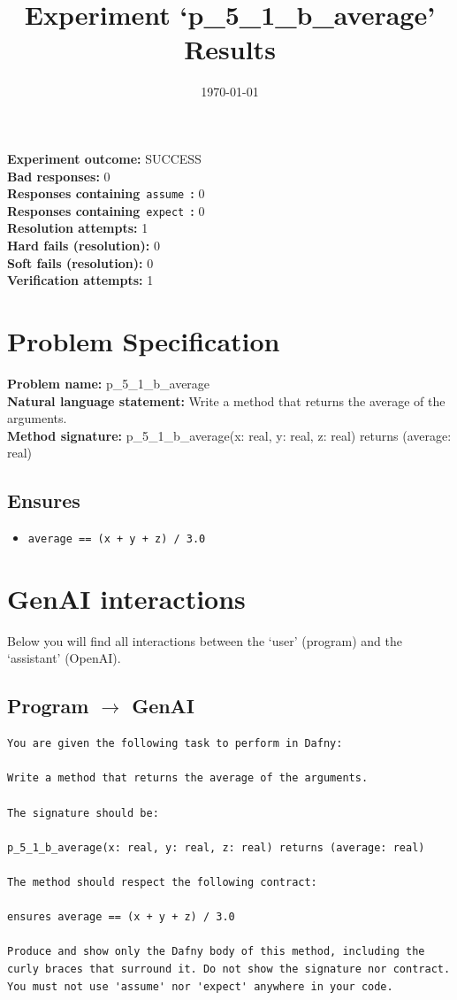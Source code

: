 \documentclass{article}
\begin{document}
\title{Experiment `p\_5\_1\_b\_average' Results}
\author{\today}
\date{}
\maketitle
\textbf{Experiment outcome: }SUCCESS
\\\textbf{Bad responses: }0
\\\textbf{Responses containing}~\texttt{assume}~\textbf{: }0
\\\textbf{Responses containing}~\texttt{expect}~\textbf{: }0
\\\textbf{Resolution attempts: }1
\\\textbf{Hard fails (resolution): }0
\\\textbf{Soft fails (resolution): }0
\\\textbf{Verification attempts: }1
\section*{Problem Specification}
\textbf{Problem name: }p\_5\_1\_b\_average
\\\textbf{Natural language statement: }Write a method that returns the average of the arguments.
\\\textbf{Method signature: }p\_5\_1\_b\_average(x: real, y: real, z: real) returns (average: real)
\subsection*{Ensures}
\begin{itemize}
\item \texttt{average == (x + y + z) / 3.0}
\end{itemize}
\clearpage
\section*{GenAI interactions}
Below you will find all interactions between the `user' (program) and the `assistant' (OpenAI).
\subsection*{Program $\rightarrow$ GenAI}
\begin{lstlisting}
You are given the following task to perform in Dafny:

Write a method that returns the average of the arguments.

The signature should be:

p_5_1_b_average(x: real, y: real, z: real) returns (average: real)

The method should respect the following contract:

ensures average == (x + y + z) / 3.0

Produce and show only the Dafny body of this method, including the curly braces that surround it. Do not show the signature nor contract. You must not use 'assume' nor 'expect' anywhere in your code.
\end{lstlisting}
\end{document}
